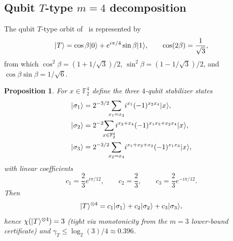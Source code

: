 \documentclass[11pt]{article}
\newtheorem{prop}[theorem]{Proposition}
\theoremstyle{definition}
\newcommand{\microspace}{\mspace{0.5mu}}
\newcommand{\ket}[1]{\lvert\microspace #1 \microspace \rangle}
\newcommand{\F}{\mathcal{F}}
\renewcommand{\F}[1]{\mathbb{F}_{#1}}
\newcommand{\chiR}{\chi}
\begin{document}
	\subsection{\texorpdfstring{Qubit $T$-type $m = 4$ decomposition}{Qubit T-type m = 4 decomposition}}\label{app:qubit-t}

	The qubit $T$-type orbit of~\cite{bravyi2005universal} is
	represented by
	\begin{equation}\label{eq:qubit-t-rep}
		\ket{T} = \cos\beta \ket{0} + e^{i \pi / 4} \sin\beta \ket{1},
		\qquad \cos(2\beta) = \frac{1}{\sqrt{3}},
	\end{equation}
	from which $\cos^2\beta = (1 + 1/\sqrt 3)/2$,
	$\sin^2\beta = (1 - 1/\sqrt 3)/2$, and $\cos\beta \sin\beta = 1/\sqrt 6$.

	\begin{prop}\label{prop:qubit-t-m4}
		For $x \in \F{2}^4$ define the three $4$-qubit stabilizer states
		\begin{equation}\label{eq:qubit-t-m4-states}
			\begin{aligned}
				\ket{\sigma_1} &= 2^{-3/2}\!\!\sum_{x_1 = x_3}\! i^{x_1} (-1)^{x_2 x_4} \ket{x}, \\
				\ket{\sigma_2} &= 2^{-2}\!\!\sum_{x \in \F{2}^4}\! i^{x_2 + x_4} (-1)^{x_1 x_3 + x_2 x_4} \ket{x}, \\
				\ket{\sigma_3} &= 2^{-3/2}\!\!\sum_{x_2 = x_4}\! i^{x_1 + x_2 + x_3} (-1)^{x_1 x_3} \ket{x},
			\end{aligned}
		\end{equation}
		with linear coefficients
		\begin{equation}\label{eq:qubit-t-m4-coeffs}
			c_1 = \frac{2}{3} e^{i \pi / 12},
			\qquad
			c_2 = \frac{2}{3},
			\qquad
			c_3 = \frac{2}{3} e^{-i \pi / 12}.
		\end{equation}
		Then
		\begin{equation}\label{eq:qubit-t-m4-id}
			\ket{T}^{\otimes 4}
			= c_1 \ket{\sigma_1} + c_2 \ket{\sigma_2} + c_3 \ket{\sigma_3},
		\end{equation}
		hence $\chiR(\ket{T}^{\otimes 4}) = 3$ (tight via monotonicity from the $m=3$ lower-bound certificate) and
		$\gamma_T \le \log_2(3)/4 \approx 0.396$.
	\end{prop}
\end{document}
